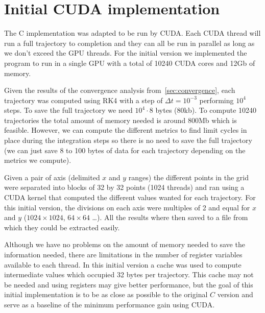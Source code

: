 
\section{Initial CUDA implementation}

The C implementation was adapted to be run by CUDA. Each CUDA thread will run a
full trajectory to completion and they can all be run in parallel as long as we
don't exceed the GPU threads. For the initial version we implemented the program
to run in a single GPU with a total of 10240 CUDA cores and 12Gb of memory.

Given the results of the convergence analysis from~\cref{sec:convergence}, each
trajectory was computed using RK4 with a step of $\Delta t=10^{-3}$ performing
$10^4$ steps. To save the full trajectory we need $10^4\cdot 8$ bytes (80kb). To
compute 10240 trajectories the total amount of memory needed is around 800Mb
which is feasible. However, we can compute the different metrics to find limit
cycles in place during the integration steps so there is no need to save the
full trajectory (we can just save 8 to 100 bytes of data for each trajectory
depending on the metrics we compute).

Given a pair of axis (delimited $x$ and $y$ ranges) the different points in the
grid were separated into blocks of 32 by 32 points (1024 threads) and ran using
a CUDA kernel that computed the different values wanted for each trajectory. For
this initial version, the divisions on each axis were multiples of 2 and equal
for $x$ and $y$ ($1024\times 1024$, $64\times 64$ \dots ). All the results where
then saved to a file from which they could be extracted easily.

Although we have no problems on the amount of memory needed to save the
information needed, there are limitations in the number of register variables
available to each thread. In this initial version a cache was used to compute
intermediate values which occupied 32 bytes per trajectory. This cache may not
be needed and using registers may give better performance, but the goal of this
initial implementation is to be as close as possible to the original $C$ version
and serve as a baseline of the minimum performance gain using CUDA.

